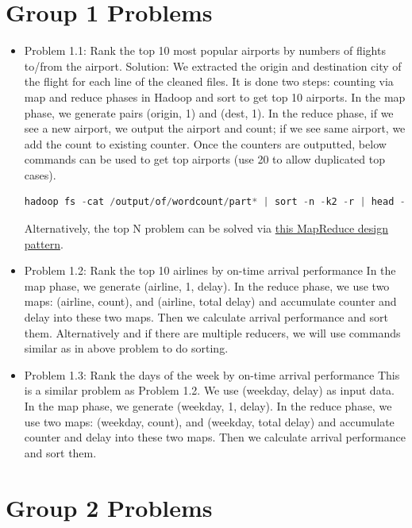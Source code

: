 \documentclass[fontsize=11pt,paper=a4]{scrartcl}
\begin{document}
\section{Group 1 Problems} 

\begin{itemize} 
\item Problem 1.1: Rank the top 10 most popular airports by numbers of flights to/from the airport.
Solution: We extracted the origin and destination city of the flight for each line of the cleaned files. It is done two steps: counting via map and reduce phases in Hadoop and sort to get top 10 airports. In the map phase, we generate pairs (origin, 1) and (dest, 1). In the reduce phase, if we see a new airport, we output the airport and count; if we see same airport, we add the count to existing counter. Once the counters are outputted, below commands can be used to get top airports (use 20 to allow duplicated top cases). 
\begin{lstlisting}[language = C++]
hadoop fs -cat /output/of/wordcount/part* | sort -n -k2 -r | head -n20
\end{lstlisting}
Alternatively, the top N problem can be solved via \href{https://github.com/adamjshook/mapreducepatterns/blob/master/MRDP/src/main/java/mrdp/ch3/TopTenDriver.java}{this MapReduce design pattern}. 

\item Problem 1.2: Rank the top 10 airlines by on-time arrival performance
In the map phase, we generate (airline, 1, delay). In the reduce phase, we use two maps: (airline, count), and (airline, total delay) and accumulate counter and delay into these two maps. Then we calculate arrival performance and sort them. Alternatively and if there are multiple reducers, we will use commands similar as in above problem to do sorting. 

\item Problem 1.3: Rank the days of the week by on-time arrival performance
This is a similar problem as Problem 1.2. We use (weekday, delay) as input data. In the map phase, we generate (weekday, 1, delay). In the reduce phase, we use two maps: (weekday, count), and (weekday, total delay) and accumulate counter and delay into these two maps. Then we calculate arrival performance and sort them.   

\end{itemize}
 
\section{Group 2 Problems}
 
\end{document}
